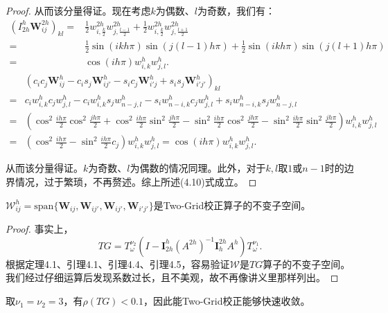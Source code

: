 \documentclass[lang=cn,10pt]{elegantbook}
\begin{document}
\begin{proof}
  从而该分量得证。现在考虑$k$为偶数、$l$为奇数，我们有：
  \begin{align*}
    \left(I^h_{2h} \mathbf{W}_{ij}^{2h}\right)_{kl} =& \frac{1}{2}w_{i,\frac{k}{2}}^{2h}w_{j,\frac{l-1}{2}}^{2h}
    +\frac{1}{2}w_{i,\frac{k}{2}}^{2h}w_{j,\frac{l+1}{2}}^{2h}\\
    =& \frac{1}{2}\sin(ikh\pi)\sin(j(l-1)h\pi)+\frac{1}{2}\sin(ikh\pi)\sin(j(l+1)h\pi)\\
    =& \cos(ih\pi)w_{i,k}^hw_{j,l}^h.
  \end{align*}
  \begin{align*}
    &\left(c_ic_j\mathbf{W}_{ij}^h-c_is_j\mathbf{W}_{ij'}^h-s_ic_j\mathbf{W}_{i'j}^h+s_is_j\mathbf{W}_{i'j'}^h\right)_{kl}\\
    =& c_iw_{i,k}^hc_jw_{j,l}^h-c_iw_{i,k}^hs_jw_{n-j,l}^h-s_iw_{n-i,k}^hc_jw_{j,l}^h+s_iw_{n-i,k}^hs_jw_{n-j,l}^h\\
    =& \left(\cos^2\frac{ih\pi}{2}\cos^2\frac{jh\pi}{2}+\cos^2\frac{ih\pi}{2}\sin^2\frac{jh\pi}{2}-\sin^2\frac{ih\pi}{2}\cos^2\frac{jh\pi}{2}-\sin^2\frac{ih\pi}{2}\sin^2\frac{jh\pi}{2}\right)w_{i,k}^hw_{j,l}^h\\
    =& \left(\cos^2\frac{ih\pi}{2}-\sin^2\frac{ih\pi}{2}c_j\right)w_{i,k}^hw_{j,l}^h = \cos(ih\pi)w_{i,k}^hw_{j,l}^h.
  \end{align*}

  从而该分量得证。$k$为奇数、$l$为偶数的情况同理。此外，对于$k,l$取$1$或$n-1$时的边界情况，过于繁琐，不再赘述。综上所述(4.10)式成立。
\end{proof}

\begin{theorem}
  $\mathcal{W}_{ij}^h=\text{span}\{\mathbf{W}_{ij},\mathbf{W}_{ij'},\mathbf{W}_{ij'},\mathbf{W}_{i'j'}\}$是Two-Grid校正算子的不变子空间。
\end{theorem}

\begin{proof}
  事实上，
  \begin{equation*}
    TG=T_\omega^{\nu_2}(I-\mathbf{I}_{2h}^h(A^{2h})^{-1}\mathbf{I}_h^{2h}A^h)T_\omega^{\nu_1}.
  \end{equation*}
  根据定理4.1、引理4.1、引理4.4、引理4.5，容易验证$\mathcal{W}$是$TG$算子的不变子空间。我们经过仔细运算后发现系数过长，且不美观，故不再像讲义里那样列出。
\end{proof}

\begin{proposition}
  取$\nu_1=\nu_2=3$，有$\rho(TG)<0.1$，因此能Two-Grid校正能够快速收敛。
\end{proposition}
\end{document}
